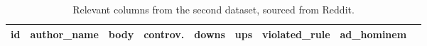 \documentclass[a4paper]{article}
\begin{document}
\begin{table}
    \caption{Relevant columns from the second dataset, sourced from Reddit.}\label{table:ah-dataset}
    \begin{tabularx}{\textwidth}{@{}llLllllll@{}}
        \hline
        id & author\_name   & body                                                                                                                                                                                                                                                                                                                                                                                                                                                                                                                                                                                                                                                                                                                                                                                                                                                                                                                                                                                                                                                                                                                                                                                                                                                                                                                                                                                                                                                                                                                                                                                        & controv. & downs & ups & violated\_rule & ad\_hominem \\ \hline

\end{tabularx}
\end{table}
\end{document}
